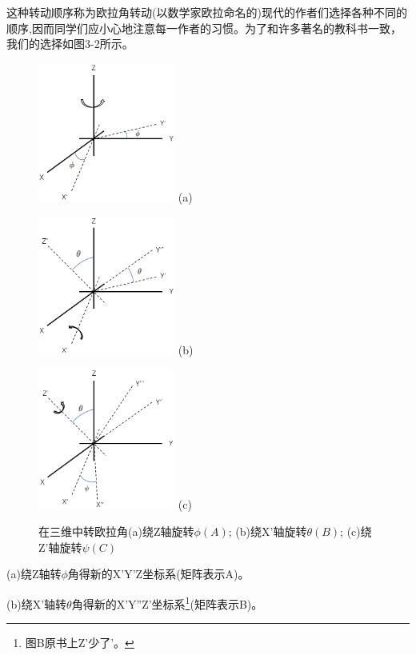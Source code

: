 这种转动顺序称为欧拉角转动(以数学家欧拉命名的)现代的作者们选择各种不同的顺序,因而同学们应小心地注意每一作者的习惯。为了和许多著名的教科书一致，我们的选择如图3-2所示。
\begin{figure}[htbp]
    \centering
    \begin{minipage}[t]{0.3\textwidth}
    \centering
    \includegraphics[width=4.5cm]{./fig/3-2a.png}
    (a)
    \end{minipage}
    \begin{minipage}[t]{0.3\textwidth}
    \centering
    \includegraphics[width=4.5cm]{./fig/3-2b.png}
    (b)
    \end{minipage}
    \begin{minipage}[t]{0.3\textwidth}
    \centering
    \includegraphics[width=4.5cm]{./fig/3-2c.png}
    (c)
    \end{minipage}
    \caption{在三维中转欧拉角(a)绕Z轴旋转$\phi(A)$; (b)绕X'轴旋转$\theta(B)$; (c)绕Z'轴旋转$\psi(C)$}
\end{figure}

(a)绕Z轴转$\phi$角得新的X'Y'Z坐标系(矩阵表示A)。

(b)绕X'轴转$\theta$角得新的X'Y''Z'坐标系\footnote{图B原书上Z'少了'。}(矩阵表示B)。

